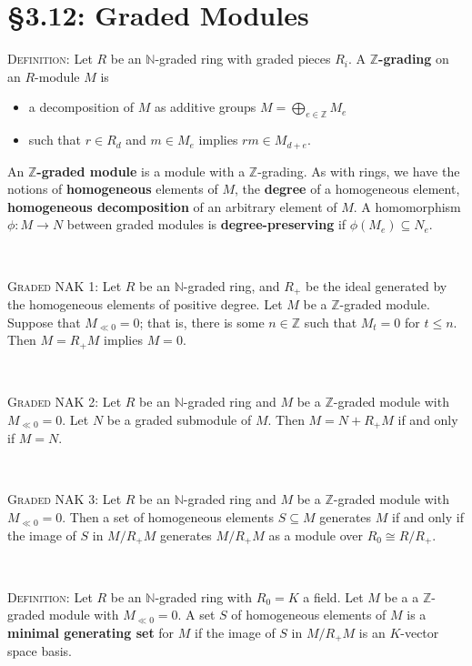 \documentclass[12pt]{amsart}
\newcommand{\N}{\mathbb{N}}
\newcommand{\Z}{\mathbb{Z}}
\newcommand{\1}{\mathbbm{1}}
\newcommand{\showsol}[1]{\def\displaysol{#1}}
\begin{document}
\showsol{0}
	
	\thispagestyle{empty}
	
	\section*{\S3.12: Graded Modules}	

\begin{framed}

\noindent \textsc{Definition:} Let $R$ be an $\N$-graded ring with graded pieces $R_i$. A \textbf{$\Z$-grading} on an $R$-module $M$ is
\begin{itemize}
\item a decomposition of $M$ as additive groups $M= \bigoplus_{e\in \Z} M_e$
\item such that $r\in R_d$ and $m\in M_e$ implies $rm\in M_{d+e}$. 
\end{itemize}
An \textbf{$\Z$-graded module} is a module with a $\Z$-grading. As with rings, we have the notions of \textbf{homogeneous} elements of $M$, the \textbf{degree} of a homogeneous element, \textbf{homogeneous decomposition} of an arbitrary element of $M$. A homomorphism $\phi:M\to N$ between graded modules is \textbf{degree-preserving} if $\phi(M_e) \subseteq N_e$.

\


\noindent \textsc{Graded NAK 1:} Let $R$ be an $\N$-graded ring, and $R_+$ be the ideal generated by the homogeneous elements of positive degree. Let $M$ be a $\Z$-graded module. Suppose that $M_{\ll 0}=0$; that is, there is some $n\in \Z$ such that $M_t=0$ for $t\leq n$. Then $M= R_+ M$ implies $M=0$.

\

\noindent \textsc{Graded NAK 2:} Let $R$ be an $\N$-graded ring and $M$ be a $\Z$-graded module with  $M_{\ll 0}=0$. Let $N$ be a graded submodule of $M$. Then $M=N+R_+ M$ if and only if $M=N$.


\

\noindent \textsc{Graded NAK 3:} Let $R$ be an $\N$-graded ring and $M$ be a $\Z$-graded module with $M_{\ll 0}=0$. Then a set of homogeneous elements $S\subseteq M$ generates $M$ if and only if the image of $S$ in $M/R_+ M$ generates  $M/R_+M$ as a module over $R_0 \cong R/R_+$.

\

\noindent \textsc{Definition:} Let $R$ be an $\N$-graded ring with $R_0=K$ a field. Let $M$ be a a $\Z$-graded module with $M_{\ll 0}=0$. A set $S$ of homogeneous elements of $M$ is a \textbf{minimal generating set} for $M$ if the image of $S$ in $M/R_+ M$ is an $K$-vector space basis.

 \end{framed}
 
\end{document}
